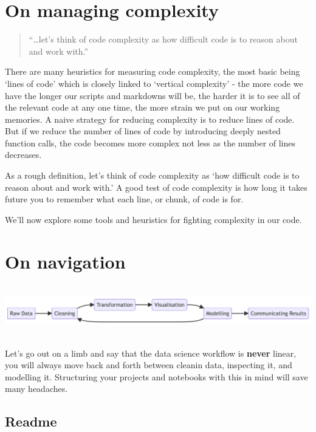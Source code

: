 \documentclass[
  letterpaper,
  DIV=11,
  numbers=noendperiod]{scrreprt}
\begin{document}
\section{On managing complexity}\label{on-managing-complexity}

\begin{quote}
``\ldots let's think of code complexity as how difficult code is to
reason about and work with.''
\end{quote}

There are many heuristics for measuring code complexity, the most basic
being `lines of code' which is closely linked to `vertical complexity' -
the more code we have the longer our scripts and markdowns will be, the
harder it is to see all of the relevant code at any one time, the more
strain we put on our working memories. A naive strategy for reducing
complexity is to reduce lines of code. But if we reduce the number of
lines of code by introducing deeply nested function calls, the code
becomes more complex not less as the number of lines decreases.

As a rough definition, let's think of code complexity as `how difficult
code is to reason about and work with.' A good test of code complexity
is how long it takes future you to remember what each line, or chunk, of
code is for.

We'll now explore some tools and heuristics for fighting complexity in
our code.

\section{On navigation}\label{on-navigation}

\includegraphics[width=9.55in,height=0.88in]{code_best_practices_files/figure-latex/mermaid-figure-1.png}

Let's go out on a limb and say that the data science workflow is
\textbf{never} linear, you will always move back and forth between
cleanin data, inspecting it, and modelling it. Structuring your projects
and notebooks with this in mind will save many headaches.

\subsection{Readme}\label{readme}
\end{document}
